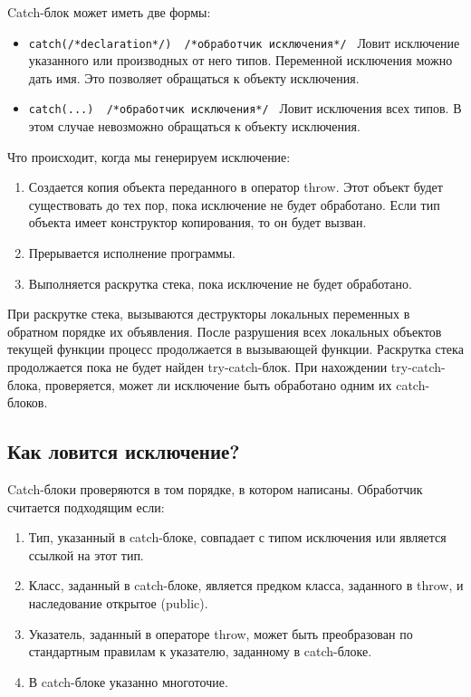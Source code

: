 Catch-блок может иметь две формы:
\begin{itemize}
    \item
    \texttt{catch(/*declaration*/) { /*обработчик исключения*/ }} Ловит исключение указанного или производных от него типов. Переменной исключения можно дать имя. Это позволяет обращаться к объекту исключения.
    \item
    \texttt{catch(...) { /*обработчик исключения*/ }}
    Ловит исключения всех типов. В этом случае невозможно обращаться к объекту исключения.
\end{itemize}

Что происходит, когда мы генерируем исключение:
\begin{enumerate}
    \item
    Создается копия объекта переданного в оператор throw. Этот объект будет существовать до тех пор, пока исключение не будет обработано. Если тип объекта имеет конструктор копирования, то он будет вызван.
    \item
    Прерывается исполнение программы.
    \item
    Выполняется раскрутка стека, пока исключение не будет обработано.
\end{enumerate}

При раскрутке стека, вызываются деструкторы локальных переменных в обратном порядке их объявления. После разрушения всех локальных объектов текущей функции процесс продолжается в вызывающей функции. Раскрутка стека продолжается пока не будет найден try-catch-блок. При нахождении try-catch-блока, проверяется, может ли исключение быть обработано одним их catch-блоков.

\subsection{Как ловится исключение?}

Catch-блоки проверяются в том порядке, в котором написаны. Обработчик считается подходящим если:
\begin{enumerate}
    \item
    Тип, указанный в catch-блоке, совпадает с типом исключения или является ссылкой на этот тип.
    \item
    Класс, заданный в catch-блоке, является предком класса, заданного в throw, и наследование открытое (public).
    \item
    Указатель, заданный в операторе throw, может быть преобразован по стандартным правилам к указателю, заданному в catch-блоке.
    \item
    В catch-блоке указанно многоточие.
\end{enumerate}

